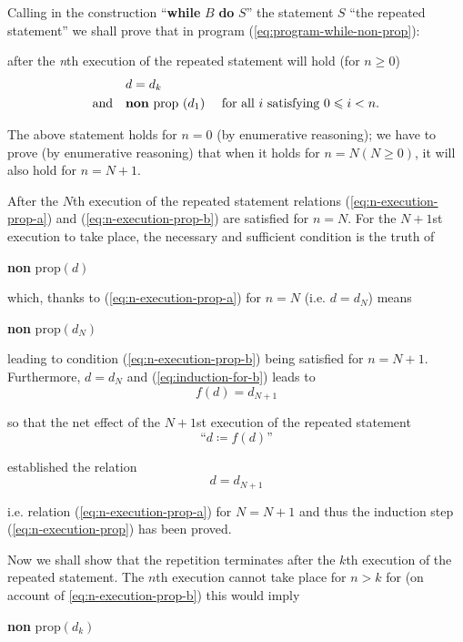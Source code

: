 Calling in the construction ``\textbf{while} $B$ \textbf{do} $S$'' the statement $S$ ``the repeated statement'' we shall prove that in program (\ref{eq:program-while-non-prop}):

\quad after the \textit{n}th execution of the repeated statement will hold (for $n \geqslant 0$)
\begin{subequations}
	\label{eq:n-execution-prop}
	\begin{align}
		\label{eq:n-execution-prop-a}
		&d=d_k& \\
		\label{eq:n-execution-prop-b}
		\text{and}\quad &\text{\textbf{non} prop }(d_1) &\text{ for all } i \text{ satisfying } 0 \leqslant i < n.
	\end{align}
\end{subequations}

The above statement holds for $n = 0$ (by enumerative reasoning); we have to prove (by enumerative reasoning) that when it holds for $n = N(N \geqslant 0)$, it will also hold for $n = N + 1$.

After the $N$th execution of the repeated statement relations (\ref{eq:n-execution-prop-a}) and (\ref{eq:n-execution-prop-b}) are satisfied for $n = N$. For the $N + 1$st execution to take place, the necessary and sufficient condition is the truth of
\begin{center}
	\textbf{non} prop$(d)$
\end{center}

\noindent
which, thanks to (\ref{eq:n-execution-prop-a}) for $n = N$ (i.e. $d = d_N$) means
\begin{center}
	\textbf{non} prop$(d_N)$
\end{center}

\noindent 
leading to condition (\ref{eq:n-execution-prop-b}) being satisfied for $n = N + 1$. Furthermore, $d = d_N$ and (\ref{eq:induction-for-b}) leads to
$$
f(d) = d_{N + 1}
$$

\noindent
so that the net effect of the $N + 1$st execution of the repeated statement
$$
\text{``}d \coloneq f(d)\text{''}
$$

\noindent
established the relation
$$
d = d_{N + 1}
$$

\noindent
i.e. relation (\ref{eq:n-execution-prop-a}) for $N = N + 1$ and thus the induction step (\ref{eq:n-execution-prop}) has been
proved.

Now we shall show that the repetition terminates after the $k$th execution of the repeated statement. The $n$th execution cannot take place for $n > k$
for (on account of \ref{eq:n-execution-prop-b}) this would imply
\begin{center}
	\textbf{non} prop$(d_k)$
\end{center}

